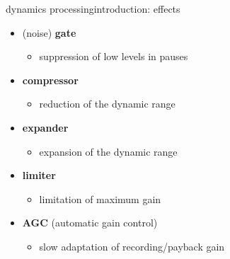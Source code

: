 \begin{frame}{dynamics processing}{introduction: effects}
	\begin{itemize}
		\item	(noise) \textbf{gate}
			\begin{itemize}
				\item	suppression of low levels in pauses
			\end{itemize}
		\pause
        \smallskip
		\item	\textbf{compressor}
			\begin{itemize}
				\item	reduction of the dynamic range
			\end{itemize}
		\pause
        \smallskip
		\item	\textbf{expander}
			\begin{itemize}
				\item	expansion of the dynamic range
			\end{itemize}
		\pause
        \smallskip
		\item	\textbf{limiter}
			\begin{itemize}
				\item	limitation of maximum gain
			\end{itemize}
		\pause
        \smallskip
		\item	\textbf{AGC} (automatic gain control)
			\begin{itemize}
				\item	slow adaptation of recording/payback gain
			\end{itemize}
	\end{itemize}
\end{frame}


